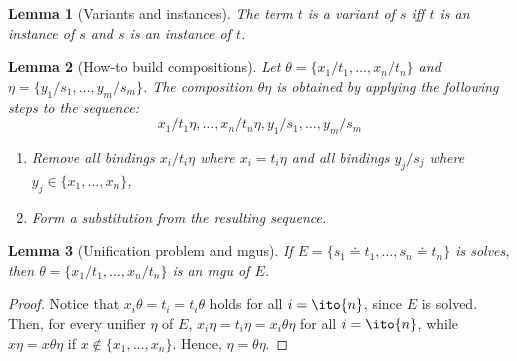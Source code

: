 \documentclass{report}
\theoremstyle{definition}
\theoremstyle{plain}
\newtheorem{lem}{Lemma}[section]
\theoremstyle{remark}
\begin{document}
\begin{lem}[Variants and instances]
    The term \(t\) is a variant of \(s\) iff \(t\) is an instance of \(s\) and \(s\) is an instance of \(t\).
\end{lem}

\begin{lem}[How-to build compositions]
    Let \(\theta = \lbrace x_1/t_1,\dotsc,x_n/t_n \rbrace\) and \(\eta = \lbrace y_1/s_1,\dotsc,y_m/s_m \rbrace\).
    The composition \(\theta\eta\) is obtained by applying the following steps to the sequence:
    \begin{equation*}
        x_1/t_1\eta,\dotsc,x_n/t_n\eta,y_1/s_1,\dotsc,y_m/s_m
    \end{equation*}
    \begin{enumerate}
        \item Remove all bindings \(x_i/t_i\eta\) where \(x_i = t_i\eta\) and all bindings \(y_j/s_j\) where \(y_j \in \lbrace x_1,\dotsc,x_n \rbrace\),
        \item Form a substitution from the resulting sequence.
    \end{enumerate}
\end{lem}

\begin{lem}[Unification problem and \gls{mgu}s]
    \label{lem:uni-mgu}
    If \(E = \lbrace s_1 \doteq t_1,\dotsc, s_n \doteq t_n \rbrace\) is solves, then \(\theta = \lbrace x_1/t_1,\dotsc,x_n/t_n \rbrace\) is an \gls{mgu} of \(E\).    
\end{lem}
\begin{proof}
    Notice that \(x_i\theta = t_i = t_i\theta\) holds for all \(i = \ito{n}\), since \(E\) is solved.
    Then, for every unifier \(\eta\) of \(E\), \(x_i\eta = t_i\eta = x_i\theta\eta\) for all \(i = \ito{n}\), while \(x\eta = x\theta\eta\) if \(x \notin \lbrace x_1,\dotsc,x_n \rbrace\). Hence, \(\eta = \theta \eta\).
\end{proof}
\end{document}
